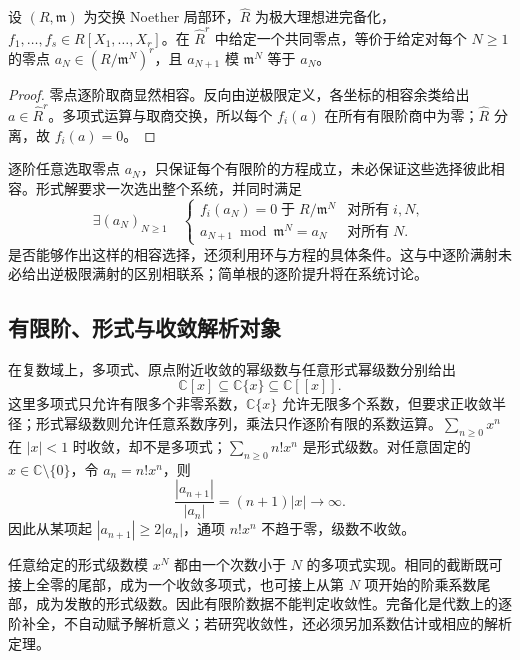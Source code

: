 \begin{proposition}\label{b3:prop:compatible-formal-solutions}
	设 \((R,\mathfrak m)\) 为交换 Noether 局部环，\(\widehat R\) 为极大理想进完备化，\(f_1,\ldots,f_s\in R[X_1,\ldots,X_r]\)。在 \(\widehat R^r\) 中给定一个共同零点，等价于给定对每个 \(N\ge1\) 的零点 \(a_N\in(R/\mathfrak m^N)^r\)，且 \(a_{N+1}\) 模 \(\mathfrak m^N\) 等于 \(a_N\)。
\end{proposition}
\begin{proof}
	零点逐阶取商显然相容。反向由逆极限定义，各坐标的相容余类给出 \(a\in\widehat R^r\)。多项式运算与取商交换，所以每个 \(f_i(a)\) 在所有有限阶商中为零；\(\widehat R\) 分离，故 \(f_i(a)=0\)。
\end{proof}

逐阶任意选取零点 \(a_N\)，只保证每个有限阶的方程成立，未必保证这些选择彼此相容。形式解要求一次选出整个系统，并同时满足
\[
	\exists(a_N)_{N\ge1}\quad
	\begin{cases}
		f_i(a_N)=0\;\text{于}\;R/\mathfrak m^N &\text{对所有}\;i,N,\\
		a_{N+1}\bmod\mathfrak m^N=a_N &\text{对所有}\;N.
	\end{cases}
\]
是否能够作出这样的相容选择，还须利用环与方程的具体条件。这与中逐阶满射未必给出逆极限满射的区别相联系；简单根的逐阶提升将在系统讨论。

\subsection{有限阶、形式与收敛解析对象}
\label{b3:subsec:1305:02}

在复数域上，多项式、原点附近收敛的幂级数与任意形式幂级数分别给出
\[
	\mathbb C[x]\subseteq\mathbb C\{x\}\subseteq\mathbb C[\![x]\!].
\]
这里多项式只允许有限多个非零系数，\(\mathbb C\{x\}\) 允许无限多个系数，但要求正收敛半径；形式幂级数则允许任意系数序列，乘法只作逐阶有限的系数运算。\(\sum_{n\ge0}x^n\) 在 \(|x|<1\) 时收敛，却不是多项式；\(\sum_{n\ge0}n!x^n\) 是形式级数。对任意固定的 \(x\in\mathbb C\setminus\{0\}\)，令 \(a_n=n!x^n\)，则
\[
	\dfrac{|a_{n+1}|}{|a_n|}=(n+1)|x|\longrightarrow\infty.
\]
因此从某项起 \(|a_{n+1}|\ge2|a_n|\)，通项 \(n!x^n\) 不趋于零，级数不收敛。

\ProseParagraphBreak
任意给定的形式级数模 \(x^N\) 都由一个次数小于 \(N\) 的多项式实现。相同的截断既可接上全零的尾部，成为一个收敛多项式，也可接上从第 \(N\) 项开始的阶乘系数尾部，成为发散的形式级数。因此有限阶数据不能判定收敛性。完备化是代数上的逐阶补全，不自动赋予解析意义；若研究收敛性，还必须另加系数估计或相应的解析定理。

